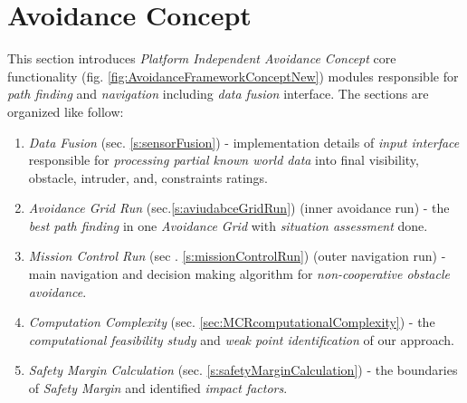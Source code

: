 \section{Avoidance Concept}\label{s:avoidanceConcept}
This section introduces \emph{Platform Independent Avoidance Concept} core functionality (fig. \ref{fig:AvoidanceFrameworkConceptNew}) modules responsible for \emph{path finding} and \emph{navigation} including \emph{data fusion} interface. The sections are organized like follow:

\begin{enumerate}
    \item \emph{Data Fusion} (sec. \ref{s:sensorFusion}) - implementation details of \emph{input interface} responsible for \emph{processing partial known world data} into final visibility, obstacle, intruder, and, constraints ratings.
    
    \item \emph{Avoidance Grid Run} (sec.\ref{s:aviudabceGridRun}) (inner avoidance run) - the \emph{best path finding} in one \emph{Avoidance Grid} with \emph{situation assessment} done.
    
    \item \emph{Mission Control Run} (sec . \ref{s:missionControlRun}) (outer navigation run) - main navigation and decision making algorithm for \emph{non-cooperative obstacle avoidance}.
    
    \item \emph{Computation Complexity} (sec. \ref{sec:MCRcomputationalComplexity}) - the \emph{computational feasibility study} and \emph{weak point identification} of our approach.
    
    \item \emph{Safety Margin Calculation} (sec. \ref{s:safetyMarginCalculation}) - the boundaries of \emph{Safety Margin} and identified \emph{impact factors}.
\end{enumerate}
